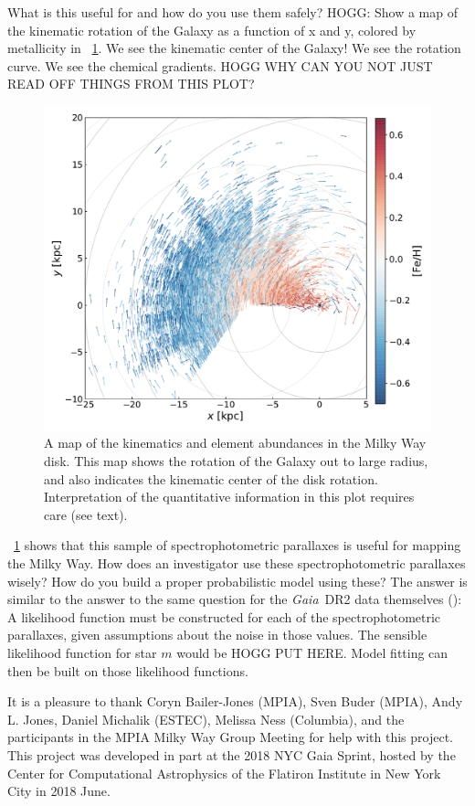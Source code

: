 \documentclass[modern]{aastex62}
\newcommand{\acronym}[1]{{\small{#1}}}
\newcommand{\project}[1]{\textsl{#1}}
\newcommand{\gaia}{\project{Gaia}}
\begin{document}
What is this useful for and how do you use them safely?
HOGG: Show a map of the kinematic rotation of the Galaxy as a function of
x and y, colored by metallicity in \figurename~\ref{fig:disk}.
We see the kinematic center of the Galaxy! We see the rotation curve.
We see the chemical gradients. HOGG WHY CAN YOU NOT JUST READ OFF THINGS FROM THIS PLOT?
\begin{figure}
\includegraphics[width=\textwidth]{map.pdf}
\caption{A map of the kinematics and element abundances in the Milky Way disk.
  This map shows the rotation of the Galaxy out to large radius, and also
  indicates the kinematic center of the disk rotation. Interpretation of
  the quantitative information in this plot requires care (see text).\label{fig:disk}}
\end{figure}

\figurename~\ref{fig:disk} shows that this sample of spectrophotometric parallaxes is useful for
mapping the Milky Way.
How does an investigator use these spectrophotometric parallaxes wisely?
How do you build a proper probabilistic model using these?
The answer is similar to the answer to the same question for the \gaia\ \acronym{DR2} data
themselves (\citealt{gaialf}): A likelihood function must be constructed for each of the
spectrophotometric parallaxes, given assumptions about the noise in those values.
The sensible likelihood function for star $m$ would be HOGG PUT HERE.
Model fitting can then be built on those likelihood functions.

\acknowledgements
It is a pleasure to thank
  Coryn Bailer-Jones (\acronym{MPIA}),
  Sven Buder (\acronym{MPIA}),
  Andy L. Jones,
  Daniel Michalik (\acronym{ESTEC}),
  Melissa Ness (Columbia),
  and the participants in the \acronym{MPIA} Milky Way Group Meeting
for help with this project.
This project was developed in part at the
2018 \acronym{NYC} Gaia Sprint, hosted by the Center for Computational Astrophysics of
the Flatiron Institute in New York City in 2018 June.
\end{document}
